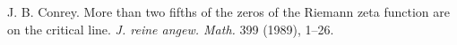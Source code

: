  J. B. Conrey. More than two fifths of the zeros of the Riemann zeta function are on the critical line. \emph{J. reine angew. Math.} 399 (1989), 1--26.
